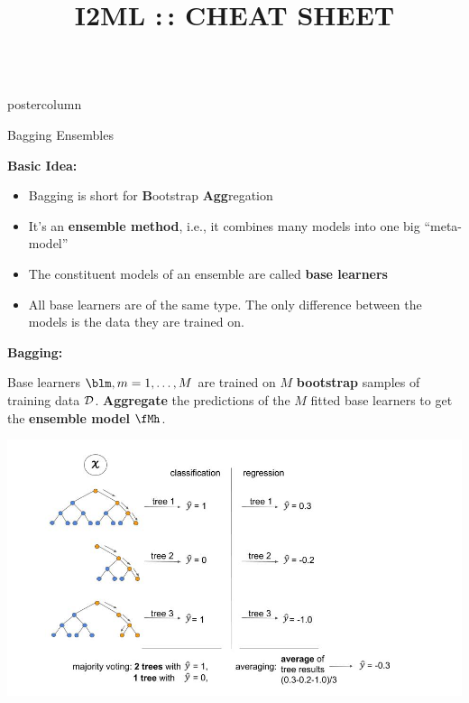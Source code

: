 \documentclass{beamer}
\title{I2ML :\,: CHEAT SHEET} %
\newlength{\columnheight} %
\begin{document}
\begin{frame}[fragile]{}
\begin{columns}
	\begin{column}{.31\textwidth}
		\begin{beamercolorbox}[center]{postercolumn}
			\begin{minipage}{.98\textwidth}
				\parbox[t][\columnheight]{\textwidth}{
					\begin{myblock}{Bagging Ensembles}
						\begin{codebox}
			\textbf{Basic Idea:}
						\end{codebox}
						\begin{itemize}[$\bullet$]     
            \setlength{\itemindent}{+.3in}
                        \item Bagging is short for \textbf{B}ootstrap \textbf{Agg}regation
                        \item It's an \textbf{ensemble method}, i.e., it combines many models into one 
        big \enquote{meta-model}
                        \item The constituent models of an ensemble are called \textbf{base learners}
                        \item All base learners are of the same type. The only difference between the models is the data they are trained on.
                        \end{itemize}
				
						\begin{codebox}
			\textbf{Bagging: }
						\end{codebox}
						Base learners $\blm, m = 1, \dots, M$ are trained on $M$ \textbf{bootstrap} samples of training data $\mathcal{D}$. \textbf{Aggregate} the predictions of the $M$ fitted base learners to get the \textbf{ensemble model} $\fMh$.
						
						\includegraphics[width=1.1\columnwidth]{img/img_1.jpg}
						

\end{myblock}}
\end{minipage}
\end{beamercolorbox}
\end{column}
\end{columns}
\end{frame}
\end{document}
